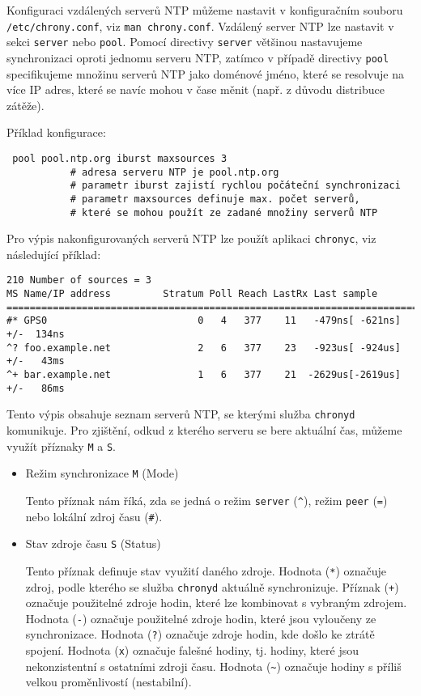 Konfiguraci vzdálených serverů NTP můžeme nastavit v konfiguračním souboru {\tt /etc/chrony.conf}, viz {\tt man chrony.conf}. Vzdálený server NTP lze nastavit v sekci {\tt server} nebo {\tt pool}. Pomocí directivy {\tt server} většinou nastavujeme synchronizaci oproti jednomu serveru NTP, zatímco v případě directivy {\tt pool} specifikujeme množinu serverů NTP jako doménové jméno, které se resolvuje na více IP adres, které se navíc mohou v čase měnit (např. z důvodu distribuce zátěže).

Příklad konfigurace:
\begin{verbatim}
 pool pool.ntp.org iburst maxsources 3
           # adresa serveru NTP je pool.ntp.org
           # parametr iburst zajistí rychlou počáteční synchronizaci
           # parametr maxsources definuje max. počet serverů,
           # které se mohou použít ze zadané množiny serverů NTP
\end{verbatim}

Pro výpis nakonfigurovaných serverů NTP lze použít aplikaci {\tt chronyc}, viz následující příklad:
\begin{verbatim}
210 Number of sources = 3
MS Name/IP address         Stratum Poll Reach LastRx Last sample
===============================================================================
#* GPS0                          0   4   377    11   -479ns[ -621ns] +/-  134ns
^? foo.example.net               2   6   377    23   -923us[ -924us] +/-   43ms
^+ bar.example.net               1   6   377    21  -2629us[-2619us] +/-   86ms
\end{verbatim}

Tento výpis obsahuje seznam serverů NTP, se kterými služba {\tt chronyd} komunikuje. Pro zjištění, odkud z kterého serveru se bere aktuální čas, můžeme využít příznaky {\tt M} a {\tt S}.
\begin{itemize}
  \item Režim synchronizace {\tt M} (Mode)
  
  Tento příznak nám říká, zda se jedná o režim {\tt server} (\verb|^|), režim {\tt peer} (\verb|=|) nebo lokální zdroj času (\verb|#|). 
  \item Stav zdroje času {\tt S} (Status)

  Tento příznak definuje stav využití daného zdroje. Hodnota (\verb|*|) označuje zdroj, podle kterého se služba {\tt chronyd} aktuálně synchronizuje. Příznak (\verb|+|) označuje použitelné zdroje hodin, které lze kombinovat s vybraným zdrojem. Hodnota (\verb|-|)  označuje použitelné zdroje hodin, které jsou vyloučeny ze synchronizace. Hodnota (\verb|?|) označuje zdroje hodin, kde došlo ke ztrátě spojení. Hodnota (\verb|x|) označuje falešné hodiny, tj. hodiny, které jsou nekonzistentní s ostatními zdroji času. Hodnota (\verb|~|) označuje hodiny s příliš velkou proměnlivostí (nestabilní). 
\end{itemize}
